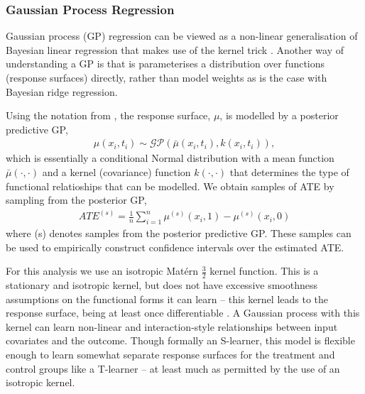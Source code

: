 \documentclass[12pt, a4paper]{article}
\begin{document}
\subsubsection*{Gaussian Process Regression}

Gaussian process (GP) regression can be viewed as a non-linear generalisation
of Bayesian linear regression that makes use of the kernel trick
\citep{williams2006, bishop2006}. Another way of understanding a GP is that is
parameterises a distribution over functions (response surfaces) directly,
rather than model weights as is the case with Bayesian ridge regression.

Using the notation from \citet{williams2006}, the response surface, $\mu$, is
modelled by a posterior predictive GP,
\begin{align*}
  \mu(x_i, t_i) \sim \mathcal{GP}\left(\bar{\mu}(x_i, t_i), k(x_i, t_i)\right),
\end{align*}
which is essentially a conditional Normal distribution with a mean function
$\bar{\mu}(\cdot, \cdot)$ and a kernel (covariance) function $k(\cdot, \cdot)$
that determines the type of functional relatioships that can be modelled.
We obtain samples of ATE by sampling from the posterior GP,
\begin{align*}
  ATE^{(s)} = \frac{1}{n} \sum_{i=1}^{n} \mu^{(s)}(x_i, 1) - \mu^{(s)}(x_i, 0)
\end{align*}
where (s) denotes samples from the posterior predictive GP. These samples can
be used to empirically construct confidence intervals over the estimated
ATE.

For this analysis we use an isotropic Mat\'{e}rn $\frac{3}{2}$ kernel function.
This is a stationary and isotropic kernel, but does not have excessive
smoothness assumptions on the functional forms it can learn -- this kernel
leads to the response surface, being at least once differentiable
\citep{williams2006}. A Gaussian process with this kernel can learn non-linear
and interaction-style relationships between input covariates and the outcome.
Though formally an S-learner, this model is flexible enough to learn somewhat
separate response surfaces for the treatment and control groups like a T-learner
-- at least much as permitted by the use of an isotropic kernel.




%
\end{document}
